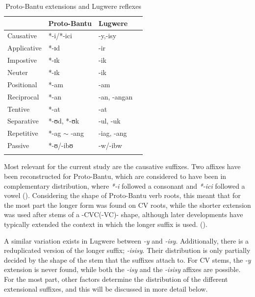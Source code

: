 \documentclass[output=paper,colorlinks,citecolor=brown,draftmode]{langscibook}
\begin{document}
\begin{table}
\caption{Proto-Bantu extensions and Lugwere reflexes}
\label{tab-proto}
	\begin{tabular}{llll}
	 \lsptoprule
            & Proto-Bantu   & Lugwere  \\
\midrule
Causative           &     *-i/*-ici      &   -y,-isy        \\
Applicative         &     *-ɪd           &    -ir       \\
Impostive           &     *-ɪk           &    -ik        \\
Neuter              &     *-ɪk           &     -ik      \\
Positional          &      *-am          &      -am            \\
Reciprocal          &      *-an          &      -an, -angan    \\
Tentive             &      *-at          &       -at           \\
Separative          &      *-ʊd, *-ʊk    &       -ul, -uk          \\
Repetitive          &      *-ag $\sim$ -ang   &       -iag, -ang   \\
Passive             &      *-ʊ/-ibʊ    &       -w/-ibw   \\           
 \lspbottomrule

		\end{tabular}
		\end{table}


Most relevant for the current study are the causative suffixes. Two affixes have been reconstructed for Proto-Bantu, which are considered to have been in complementary distribution, where \emph{*-i} followed a consonant and \emph{*-ici} followed a vowel (\cite{schadeberg2019word}). Considering the shape of Proto-Bantu verb roots, this meant that for the most part the longer form was found on CV roots, while the shorter extension was used after stems of a -CVC(-VC)- shape, although later developments have typically extended the context in which the longer suffix is used. (\cite{schadeberg2019word}). 

A similar variation exists in Lugwere between \emph{-y} and \emph{-isy}. Additionally, there is a reduplicated version of the longer suffix; \emph{-isisy}. Their distribution is only partially decided by the shape of the stem that the suffixes attach to. For CV stems, the \emph{-y} extension is never found, while both the \emph{-isy} and the \emph{-isisy} affixes are possible.  
For the most part, other factors determine the distribution of the different extensional suffixes, and this will be discussed in more detail below. 
\end{document}
